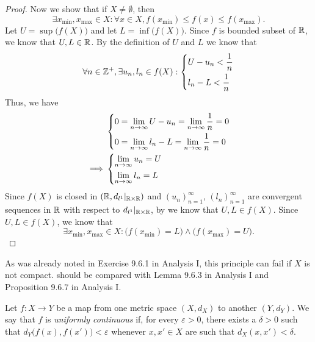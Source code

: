 \begin{proof}
  Now we show that if \(X \neq \emptyset\), then
  \[
    \exists x_{\min}, x_{\max} \in X : \forall x \in X, f(x_{\min}) \leq f(x) \leq f(x_{\max}).
  \]
  Let \(U = \sup\big(f(X)\big)\) and let \(L = \inf\big(f(X)\big)\).
  Since \(f\) is bounded subset of \(\mathbb{R}\), we know that \(U, L \in \mathbb{R}\).
  By the definition of \(U\) and \(L\) we know that
  \[
    \forall n \in \mathbb{Z}^+, \exists u_n, l_n \in f(X) : \begin{dcases}
      U - u_n < \dfrac{1}{n} \\
      l_n - L < \dfrac{1}{n}
    \end{dcases}
  \]
  Thus, we have
  \begin{align*}
             & \begin{dcases}
                 0 = \lim_{n \to \infty} U - u_n = \lim_{n \to \infty} \dfrac{1}{n} = 0 \\
                 0 = \lim_{n \to \infty} l_n - L = \lim_{n \to \infty} \dfrac{1}{n} = 0
               \end{dcases} \\
    \implies & \begin{dcases}
                 \lim_{n \to \infty} u_n = U \\
                 \lim_{n \to \infty} l_n = L
               \end{dcases}
  \end{align*}
  Since \(f(X)\) is closed in \((\mathbb{R}, d_{l^1}|_{\mathbb{R} \times \mathbb{R}})\) and \((u_n)_{n = 1}^\infty\), \((l_n)_{n = 1}^\infty\) are convergent sequences in \(\mathbb{R}\) with respect to \(d_{l^1}|_{\mathbb{R} \times \mathbb{R}}\), by  we know that \(U, L \in f(X)\).
  Since \(U, L \in f(X)\), we know that
  \[
    \exists x_{\min}, x_{\max} \in X : \big(f(x_{\min}) = L\big) \land \big(f(x_{\max}) = U\big).
  \]
\end{proof}

\begin{rmk}\label{ii:2.3.3}
  As was already noted in Exercise 9.6.1 in Analysis I, this principle can fail if \(X\) is not compact.
   should be compared with Lemma 9.6.3 in Analysis I and Proposition 9.6.7 in Analysis I.
\end{rmk}

\begin{defn}\label{ii:2.3.4}
  Let \(f : X \to Y\) be a map from one metric space \((X, d_X)\) to another \((Y, d_Y)\).
  We say that \(f\) is \emph{uniformly continuous} if, for every \(\varepsilon > 0\), there exists a \(\delta > 0\) such that \(d_Y\big(f(x), f(x')\big) < \varepsilon\) whenever \(x, x' \in X\) are such that \(d_X(x, x') < \delta\).
\end{defn}

